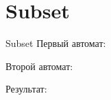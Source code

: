 \section{Subset}
\begin{frame}{Subset}
	Первый автомат:


	Второй автомат:


	Результат:
\end{frame}
